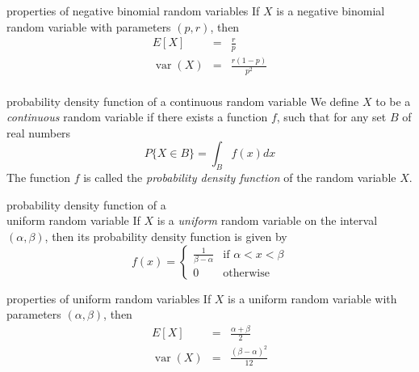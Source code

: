 \documentclass[avery5371,grid]{flashcards}
\DeclareMathOperator{\var}{var}
\begin{document}
\begin{flashcard}[Theorem]{properties of negative binomial random variables}
If $X$ is a negative binomial random variable with parameters $(p,r)$, then
\begin{eqnarray*}
E[X] &=& \frac{r}{p} \\
\var(X) &=& \frac{r(1-p)}{p^2} \\
\end{eqnarray*}
\end{flashcard}

\begin{flashcard}[Definition]{probability density function of a
continuous random variable}
We define $X$ to be a \textit{continuous} random variable if there
exists a function $f$, such that for any set $B$ of real numbers
\begin{displaymath}
P\lbrace X\in B\rbrace = \int_B f(x)dx
\end{displaymath}
The function $f$ is called the \textit{probability density function}
of the random variable $X$.
\end{flashcard}

\begin{flashcard}[Definition]{probability density function of a \\
uniform random variable}
If $X$ is a \textit{uniform} random variable on the interval $(\alpha,\beta)$,
then its probability density function is given by
\begin{displaymath}
f(x) = \left\{
\begin{array}{ll}
\frac{1}{\beta - \alpha} & \textrm{if $\alpha < x < \beta$}\\
0 & \textrm{otherwise}
\end{array} \right.
\end{displaymath}
\end{flashcard}

\begin{flashcard}[Theorem]{properties of uniform random variables}
If $X$ is a uniform random variable with parameters $(\alpha,\beta)$, then
\begin{eqnarray*}
E[X] &=& \frac{\alpha + \beta}{2}\\
\var(X) &=& \frac{(\beta - \alpha)^2}{12}
\end{eqnarray*}
\end{flashcard}
\end{document}
